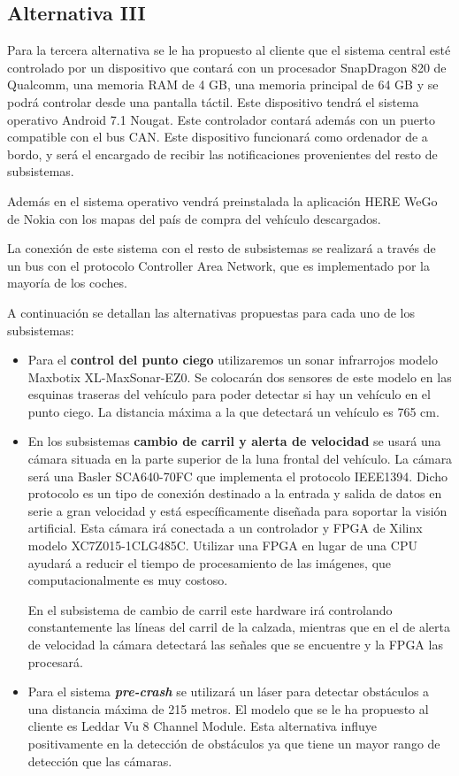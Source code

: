 \subsection{Alternativa III}

\par Para la tercera alternativa se le ha propuesto al cliente que el sistema central esté controlado por un dispositivo que contará con un procesador SnapDragon 820 de Qualcomm, una memoria RAM de 4 GB, una memoria principal de 64 GB y se podrá controlar desde una pantalla táctil. Este dispositivo tendrá el sistema operativo Android 7.1 Nougat. Este controlador contará además con un puerto compatible con el bus CAN. Este dispositivo funcionará como ordenador de a bordo, y será el encargado de recibir las notificaciones provenientes del resto de subsistemas.


Además en el sistema operativo vendrá preinstalada la aplicación HERE WeGo de Nokia con los mapas del país de compra del vehículo descargados.

La conexión de este sistema con el resto de subsistemas se realizará a través de un bus con el protocolo Controller Area Network, que es implementado por la mayoría de los coches.


\par A continuación se detallan las alternativas propuestas para cada uno de los subsistemas:

\begin{itemize}[-]
    \item Para el \textbf{control del punto ciego} utilizaremos un sonar infrarrojos modelo Maxbotix XL-MaxSonar-EZ0. Se colocarán dos sensores de este modelo en las esquinas traseras del vehículo para poder detectar si hay un vehículo en el punto ciego. La distancia máxima a la que detectará un vehículo es 765 cm.
    \item En los subsistemas \textbf{cambio de carril y alerta de velocidad} se usará una cámara situada en la parte superior de la luna frontal del vehículo. La cámara será una Basler SCA640-70FC que implementa el protocolo IEEE1394. Dicho protocolo es un tipo de conexión destinado a la entrada y salida de datos en serie a gran velocidad y está específicamente diseñada para soportar la visión artificial.
    Esta cámara irá conectada a un controlador y FPGA de Xilinx modelo XC7Z015-1CLG485C. Utilizar una FPGA en lugar de una CPU ayudará a reducir el tiempo de procesamiento de las imágenes, que computacionalmente es muy costoso.

    En el subsistema de cambio de carril este hardware irá controlando constantemente las líneas del carril de la calzada, mientras que en el de alerta de velocidad la cámara detectará las señales que se encuentre y la FPGA las procesará.
    \item Para el sistema \textbf{\textit{pre-crash}}  se utilizará un láser para detectar obstáculos a una distancia máxima de 215 metros. El modelo que se le ha propuesto al cliente es Leddar Vu 8 Channel Module. Esta alternativa influye positivamente en la detección de obstáculos ya que tiene un mayor rango de detección que las cámaras.

\end{itemize}

